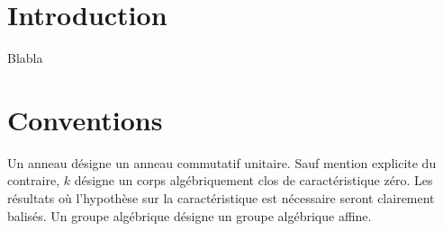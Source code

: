 
\chapter*{Introduction}

Blabla

\chapter*{Conventions}
\label{sec:conventions}

Un anneau désigne un anneau commutatif unitaire. Sauf mention explicite du contraire, $k$ désigne un corps algébriquement clos de caractéristique zéro. Les résultats où l'hypothèse sur la caractéristique est nécessaire seront clairement balisés.
Un groupe algébrique désigne un groupe algébrique affine.

